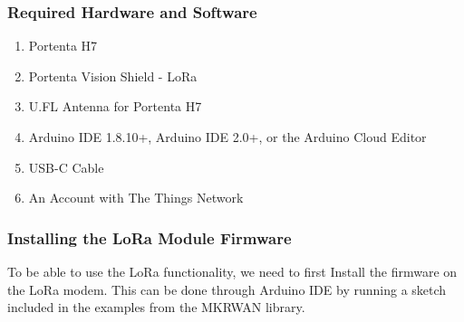 \begin{itemize}
%	
%	

\subsubsection{Required Hardware and Software}

\begin{enumerate}
	\item Portenta H7
	\item Portenta Vision Shield - LoRa
	\item U.FL Antenna for Portenta H7 
	\item Arduino IDE 1.8.10+, Arduino IDE 2.0+, or the Arduino Cloud Editor
	\item USB-C Cable
	\item An Account with The Things Network \cite{ArduinoTTN:2024}
\end{enumerate}


\subsubsection {Installing the LoRa Module Firmware}
To be able to use the LoRa functionality, we need to first Install the firmware on the LoRa modem. This can be done through Arduino IDE by running a sketch included in the examples from the MKRWAN library.


\end{itemize}
